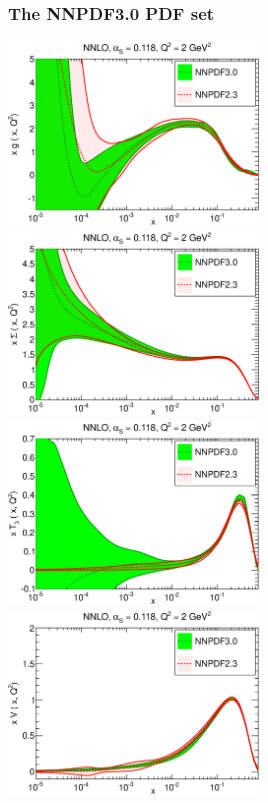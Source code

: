 \documentclass[10pt]{beamer}
\begin{document}
\begin{frame}
\frametitle{The NNPDF3.0 PDF set}

\includegraphics[width=0.50\textwidth]{figures/xg-abs-30_vs_23_lowscale.eps}
\includegraphics[width=0.50\textwidth]{figures/xsinglet-abs-30_vs_23_lowscale.eps}\\
\includegraphics[width=0.50\textwidth]{figures/xtriplet-abs-30_vs_23_lowscale.eps}
\includegraphics[width=0.50\textwidth]{figures/xvalence-abs-30_vs_23_lowscale.eps}


\end{frame}
\end{document}
